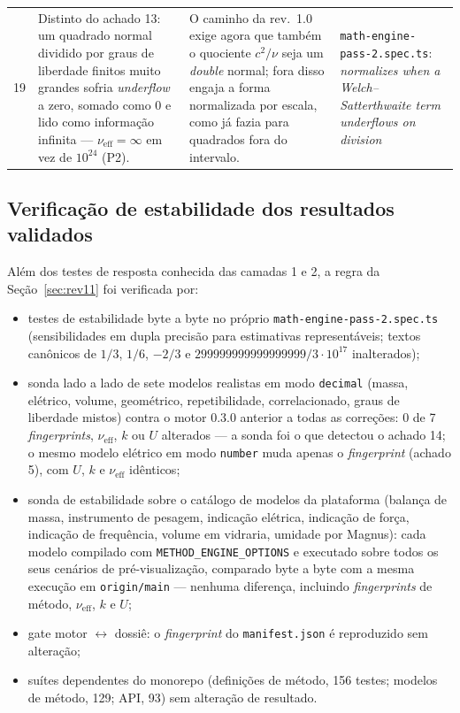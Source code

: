 \documentclass[11pt,a4paper]{article}
\newcommand{\docVersion}{0.3.0}
\newcommand{\code}[1]{\texttt{\small #1}}
\begin{document}
\begin{small}
\begin{longtable}{L{0.5cm} L{4.6cm} L{5.4cm} L{4.6cm}}
  19 & Distinto do achado 13: um quadrado normal dividido por graus de liberdade finitos muito grandes sofria \emph{underflow} a zero, somado como 0 e lido como informação infinita --- \(\nu_{\text{eff}} = \infty\) em vez de \(10^{24}\) (P2). & O caminho da rev.\ 1.0 exige agora que também o quociente \(c^2/\nu\) seja um \emph{double} normal; fora disso engaja a forma normalizada por escala, como já fazia para quadrados fora do intervalo. & \code{math-engine-pass-2.spec.ts}: \emph{normalizes when a Welch--Satterthwaite term underflows on division} \\
\end{longtable}
\end{small}

\subsection{Verificação de estabilidade dos resultados validados}

Além dos testes de resposta conhecida das camadas 1 e 2, a regra da Seção~\ref{sec:rev11} foi verificada por:

\begin{itemize}
  \item testes de estabilidade byte a byte no próprio \texttt{math-engine-pass-2.spec.ts} (sensibilidades em dupla precisão para estimativas representáveis; textos canônicos de \(1/3\), \(1/6\), \(-2/3\) e \(299999999999999999/3 \cdot 10^{17}\) inalterados);
  \item sonda lado a lado de sete modelos realistas em modo \texttt{decimal} (massa, elétrico, volume, geométrico, repetibilidade, correlacionado, graus de liberdade mistos) contra o motor \docVersion{} anterior a todas as correções: 0 de 7 \emph{fingerprints}, \(\nu_{\text{eff}}\), \(k\) ou \(U\) alterados --- a sonda foi o que detectou o achado 14; o mesmo modelo elétrico em modo \texttt{number} muda apenas o \emph{fingerprint} (achado 5), com \(U\), \(k\) e \(\nu_{\text{eff}}\) idênticos;
  \item sonda de estabilidade sobre o catálogo de modelos da plataforma (balança de massa, instrumento de pesagem, indicação elétrica, indicação de força, indicação de frequência, volume em vidraria, umidade por Magnus): cada modelo compilado com \texttt{METHOD\_ENGINE\_OPTIONS} e executado sobre todos os seus cenários de pré-visualização, comparado byte a byte com a mesma execução em \texttt{origin/main} --- nenhuma diferença, incluindo \emph{fingerprints} de método, \(\nu_{\text{eff}}\), \(k\) e \(U\);
  \item gate motor \(\leftrightarrow\) dossiê: o \emph{fingerprint} do \texttt{manifest.json} é reproduzido sem alteração;
  \item suítes dependentes do monorepo (definições de método, 156 testes; modelos de método, 129; API, 93) sem alteração de resultado.
\end{itemize}
\end{document}
